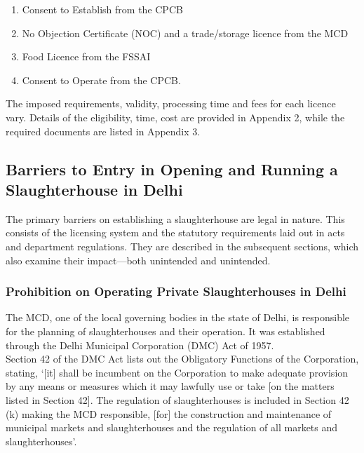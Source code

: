 \documentclass[a4paper, 12pt]{article}
\begin{document}
\begin{enumerate}
\item Consent to Establish from the CPCB
\item No Objection Certificate (NOC) and a trade/storage licence from the MCD
\item Food Licence from the FSSAI
\item Consent to Operate from the CPCB.\\
\end{enumerate}

The imposed requirements, validity, processing time and fees for each licence vary. Details of the eligibility, time, cost are provided in Appendix 2, while the required documents are listed in Appendix 3. \\

\subsection{Barriers to Entry in Opening and Running a Slaughterhouse in Delhi}
The primary barriers on establishing a slaughterhouse are legal in nature. This consists of the licensing system and the statutory requirements laid out in acts and department regulations. They are described in the subsequent sections, which also examine their impact—both unintended and unintended.\\

\subsubsection{Prohibition on Operating Private Slaughterhouses in Delhi}

The MCD, one of the local governing bodies in the state of Delhi, is responsible for the planning of slaughterhouses and their operation. It was established through the Delhi Municipal Corporation (DMC) Act of 1957. \\

Section 42 of the DMC Act lists out the Obligatory Functions of the Corporation, stating, ‘[it] shall be incumbent on the Corporation to make adequate provision by any means or measures which it may lawfully use or take [on the matters listed in Section 42]. The regulation of slaughterhouses is included in Section 42 (k) making the MCD responsible, [for] the construction and maintenance of municipal markets and slaughterhouses and the regulation of all markets and slaughterhouses’.\\
\end{document}
